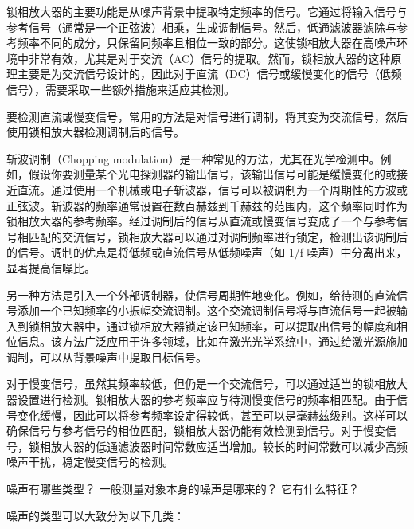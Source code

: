 \documentclass[dvipsnames, svgnames,a4paper,11pt]{article}
\begin{document}
锁相放大器的主要功能是从噪声背景中提取特定频率的信号。它通过将输入信号与参考信号（通常是一个正弦波）相乘，生成调制信号。然后，低通滤波器滤除与参考频率不同的成分，只保留同频率且相位一致的部分。这使锁相放大器在高噪声环境中非常有效，尤其是对于交流（AC）信号的提取。然而，锁相放大器的这种原理主要是为交流信号设计的，因此对于直流（DC）信号或缓慢变化的信号（低频信号），需要采取一些额外措施来适应其检测。

要检测直流或慢变信号，常用的方法是对信号进行调制，将其变为交流信号，然后使用锁相放大器检测调制后的信号。

斩波调制（Chopping modulation）是一种常见的方法，尤其在光学检测中。例如，假设你要测量某个光电探测器的输出信号，该输出信号可能是缓慢变化的或接近直流。通过使用一个机械或电子斩波器，信号可以被调制为一个周期性的方波或正弦波。斩波器的频率通常设置在数百赫兹到千赫兹的范围内，这个频率同时作为锁相放大器的参考频率。经过调制后的信号从直流或慢变信号变成了一个与参考信号相匹配的交流信号，锁相放大器可以通过对调制频率进行锁定，检测出该调制后的信号。调制的优点是将低频或直流信号从低频噪声（如 1/f 噪声）中分离出来，显著提高信噪比。

另一种方法是引入一个外部调制器，使信号周期性地变化。例如，给待测的直流信号添加一个已知频率的小振幅交流调制。这个交流调制信号将与直流信号一起被输入到锁相放大器中，通过锁相放大器锁定该已知频率，可以提取出信号的幅度和相位信息。该方法广泛应用于许多领域，比如在激光光学系统中，通过给激光源施加调制，可以从背景噪声中提取目标信号。

对于慢变信号，虽然其频率较低，但仍是一个交流信号，可以通过适当的锁相放大器设置进行检测。锁相放大器的参考频率应与待测慢变信号的频率相匹配。由于信号变化缓慢，因此可以将参考频率设定得较低，甚至可以是毫赫兹级别。这样可以确保信号与参考信号的相位匹配，锁相放大器仍能有效检测到信号。对于慢变信号，锁相放大器的低通滤波器时间常数应适当增加。较长的时间常数可以减少高频噪声干扰，稳定慢变信号的检测。



\begin{question}
	噪声有哪些类型？ 一般测量对象本身的噪声是哪来的？ 它有什么特征？
\end{question}

	噪声的类型可以大致分为以下几类：
\end{document}
